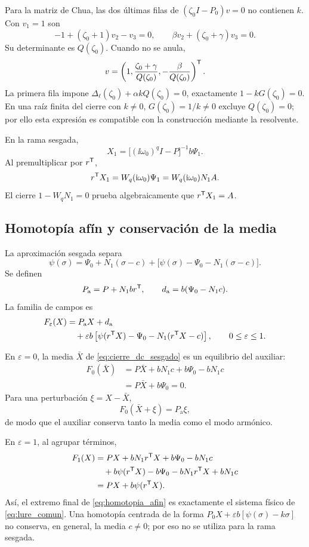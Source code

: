 Para la matriz de Chua, las dos últimas filas de
\((\zeta_0I-P_0)v=0\) no contienen \(k\). Con \(v_1=1\) son
\[
 -1+(\zeta_0+1)v_2-v_3=0,
 \qquad \beta v_2+(\zeta_0+\gamma)v_3=0.
\]
Su determinante es \(Q(\zeta_0)\). Cuando no se anula,
\begin{equation}
 v=\left(1,\frac{\zeta_0+\gamma}{Q(\zeta_0)},
              -\frac{\beta}{Q(\zeta_0)}\right)^{\mathsf T}.
 \label{eq:modo-chua-componentes-explicitas}
\end{equation}
La primera fila impone
\(\Delta_\ell(\zeta_0)+\alpha kQ(\zeta_0)=0\), exactamente
\(1-kG(\zeta_0)=0\). En una raíz finita del cierre con \(k\ne0\),
\(G(\zeta_0)=1/k\ne0\) excluye \(Q(\zeta_0)=0\); por ello esta
expresión es compatible con la construcción mediante la resolvente.

En la rama sesgada,
\[
X_1=\bigl[(\ii\omega_0)^qI-P\bigr]^{-1}b\Psi_1.
\]
Al premultiplicar por \(r^{\mathsf T}\),
\[
r^{\mathsf T}X_1
=W_q(\mathrm{i}\omega_0)\Psi_1
=W_q(\mathrm{i}\omega_0)N_1A.
\]
El cierre \(1-W_qN_1=0\) prueba algebraicamente que
\(r^{\mathsf T}X_1=A\).

\fi
\ifnum{}\relax
\subsection{Homotopía afín y conservación de la media}
\label{app:homotopia_afin}

La aproximación sesgada separa
\[
\psi(\sigma)
=\Psi_0+N_1(\sigma-c)
+\bigl[\psi(\sigma)-\Psi_0-N_1(\sigma-c)\bigr].
\]
Se definen
\begin{equation}
P_{\mathrm a}=P+N_1br^{\mathsf T},\qquad
d_{\mathrm a}=b(\Psi_0-N_1c).
\label{eq:parametros_homotopia_afin}
\end{equation}
La familia de campos es
\begin{equation}
\begin{aligned}
F_\varepsilon(X)
&=P_{\mathrm a}X+d_{\mathrm a}\\
&\quad+\varepsilon b
\left[
\psi(r^{\mathsf T}X)-\Psi_0-N_1(r^{\mathsf T}X-c)
\right],
\qquad 0\leq\varepsilon\leq1.
\end{aligned}
\label{eq:homotopia_afin}
\end{equation}

En \(\varepsilon=0\), la media \(\bar X\) de
\cref{eq:cierre_dc_sesgado} es un equilibrio del auxiliar:
\begin{align*}
F_0(\bar X)
&=P\bar X+bN_1c+b\Psi_0-bN_1c\\
&=P\bar X+b\Psi_0=0.
\end{align*}
Para una perturbación \(\xi=X-\bar X\),
\[
F_0(\bar X+\xi)=P_{\mathrm a}\xi,
\]
de modo que el auxiliar conserva tanto la media como el modo armónico.

En \(\varepsilon=1\), al agrupar términos,
\begin{align*}
F_1(X)
&=PX+bN_1r^{\mathsf T}X+b\Psi_0-bN_1c\\
&\quad+b\psi(r^{\mathsf T}X)-b\Psi_0-bN_1r^{\mathsf T}X+bN_1c\\
&=PX+b\psi(r^{\mathsf T}X).
\end{align*}
Así, el extremo final de \cref{eq:homotopia_afin} es exactamente el sistema
físico de \cref{eq:lure_comun}. Una homotopía centrada de la forma
\(P_0X+\varepsilon b[\psi(\sigma)-k\sigma]\) no conserva, en general, la
media \(c\neq0\); por eso no se utiliza para la rama sesgada.
\fi
